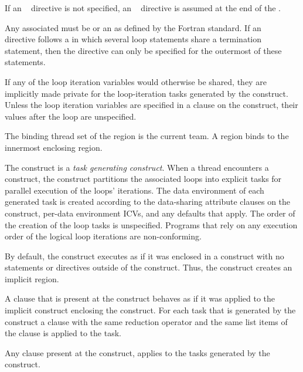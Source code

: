 If an ~ directive is not specified, an 
~ directive is assumed at the end of the 
.

Any associated  must be  or an 
 as defined by the Fortran standard. 
If an ~ directive follows a  
in which several loop statements share a  
termination statement, then the directive can only be specified for the 
outermost of these  statements.

If any of the loop iteration variables would otherwise be shared, they are implicitly made private for the loop-iteration tasks generated by the  construct. Unless the loop iteration variables are specified in a  clause on the  construct, their values after the loop are unspecified.
\fortranspecificend

\binding
The binding thread set of the  region is the current team. A  region binds to the innermost enclosing  region.

\descr
The  construct is a \emph{task generating construct}. When a thread encounters a  construct, the construct partitions the associated loops into explicit tasks for parallel execution of the loops' iterations. The data environment of each generated task is created according to the data-sharing attribute clauses on the  construct, per-data environment ICVs, and any defaults that apply. The order of the creation of the loop tasks is unspecified.
Programs that rely on any execution order of the logical loop iterations are non-conforming. 

By default, the  construct executes as if it was enclosed in a  construct with no statements or directives outside of the  construct. Thus, the  construct creates an implicit  region. 

A  clause that is present at the  construct behaves as if it was applied to the implicit  construct enclosing the  construct.  
For each task that is generated by the  construct a  clause with the same reduction operator and the same list items of the  clause is applied to the task.

Any  clause present at the  construct, applies to the tasks generated by the  construct.

